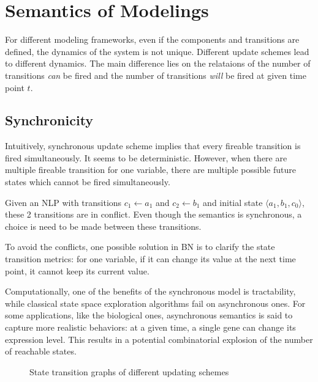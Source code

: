 \section{Semantics of Modelings}
For different modeling frameworks, even if the components and transitions are defined, the dynamics of the system is not unique. 
Different update schemes lead to different dynamics.
The main difference lies on the relataions of the number of transitions \textit{can} be fired and the number of transitions \textit{will} be fired at given time point $t$.


\subsection{Synchronicity}
Intuitively, synchronous update scheme implies that every fireable transition is fired simultaneously.
It seems to be deterministic. 
However, when there are multiple fireable transition for one variable, there are multiple possible future states which cannot be fired simultaneously.
\begin{example}
Given an NLP with transitions $c_1\gets a_1$ and $c_2\gets b_1$ and initial state $\langle a_1, b_1, c_0\rangle$, these 2 transitions are in conflict.
Even though the semantics is synchronous, a choice is need to be made between these transitions.
\end{example}

To avoid the conflicts, one possible solution in BN is to clarify the state transition metrics:
for one variable, if it can change its value at the next time point, it cannot keep its current value.

Computationally, one of the benefits of the synchronous model is tractability, while classical state space exploration algorithms fail on asynchronous ones.
For some applications, like the biological ones, asynchronous semantics is said to capture more realistic behaviors: at a given time, a single gene can change its expression level.
This results in a potential combinatorial explosion of the number of reachable states.

\begin{figure}[ht]
\caption[Update schemes]{State transition graphs of different updating schemes}
\end{figure}
